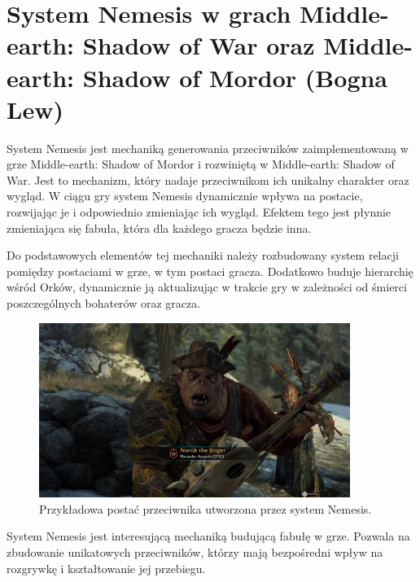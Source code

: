 \section{System Nemesis w grach Middle-earth: Shadow of War oraz Middle-earth: Shadow of Mordor (Bogna Lew)}
System Nemesis jest mechaniką generowania przeciwników zaimplementowaną w grze Middle-earth: Shadow of Mordor i
rozwiniętą w Middle-earth: Shadow of War. Jest to mechanizm, który nadaje przeciwnikom ich unikalny charakter oraz
wygląd. W ciągu gry system Nemesis dynamicznie wpływa na postacie, rozwijając je i odpowiednio zmieniając ich wygląd.
Efektem tego jest płynnie zmieniająca się fabuła, która dla każdego gracza będzie inna.

Do podstawowych elementów tej mechaniki należy rozbudowany system relacji pomiędzy postaciami w grze, w tym postaci
gracza. Dodatkowo buduje hierarchię wśród Orków, dynamicznie ją aktualizując w trakcie gry w zależności od śmierci
poszczególnych bohaterów oraz gracza.

\begin{figure}[h!]
    \centering
    \includegraphics[width=0.9\textwidth]{images/system_nemesis.png}
    \caption{Przykładowa postać przeciwnika utworzona przez system Nemesis.}
\end{figure}

System Nemesis jest interesującą mechaniką budującą fabułę w grze. Pozwala na zbudowanie unikatowych przeciwników,
którzy mają bezpośredni wpływ na rozgrywkę i kształtowanie jej przebiegu.